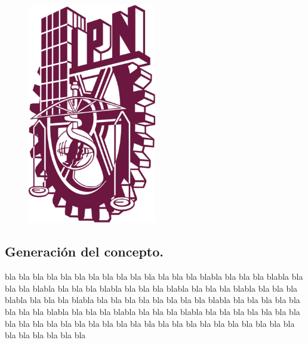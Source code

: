 \documentclass[11pt]{report}
\begin{document}
\begin{figure}[H]
	\begin{center}
 		\includegraphics[width = 0.5\textwidth]{images/ipn.png}
	\end{center} 
\end{figure}



\subsection{Generación del concepto.}

bla bla bla bla bla bla bla bla bla bla bla bla bla bla blabla bla bla bla blabla bla bla bla blabla bla bla bla blabla bla bla bla blabla bla bla bla blabla bla bla bla blabla bla bla bla blabla bla bla bla bla bla bla bla bla blabla bla bla bla bla bla bla bla bla blabla bla bla bla blabla bla bla bla blabla bla bla bla bla bla bla bla bla bla bla bla bla bla bla bla bla bla bla bla bla bla bla bla bla bla bla bla bla bla bla bla bla bla bla
\end{document}
